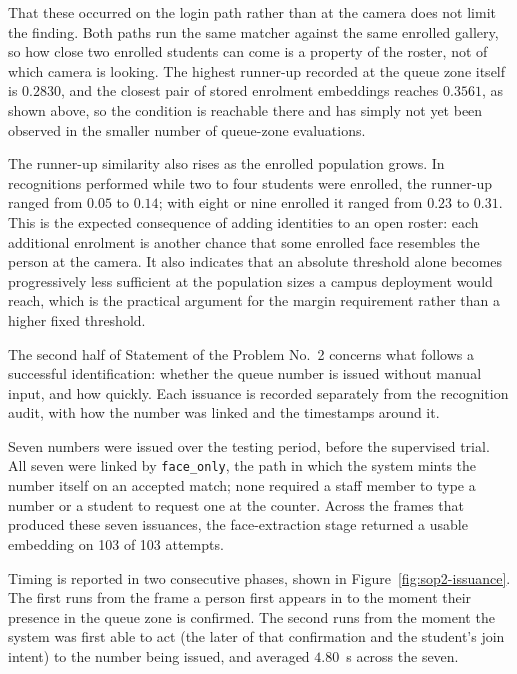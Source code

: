 \documentclass{research}
\begin{document}
That these occurred on the login path rather than at the camera does not
limit the finding. Both paths run the same matcher against the same
enrolled gallery, so how close two enrolled students can come is a
property of the roster, not of which camera is looking. The highest
runner-up recorded at the queue zone itself is $0.2830$, and the closest
pair of stored enrolment embeddings reaches $0.3561$,
as shown above, so the condition is reachable
there and has simply not yet been observed in the smaller number of
queue-zone evaluations.

The runner-up similarity also rises as the enrolled population grows. In
recognitions performed while two to four students were enrolled, the
runner-up ranged from $0.05$ to $0.14$; with eight or nine enrolled it
ranged from $0.23$ to $0.31$. This is the expected consequence of adding
identities to an open roster: each additional enrolment is another chance
that some enrolled face resembles the person at the camera. It also
indicates that an absolute threshold alone becomes progressively less
sufficient at the population sizes a campus deployment would reach, which
is the practical argument for the margin requirement rather than a higher
fixed threshold.

\label{subsec:sop2-issuance}

The second half of Statement of the Problem No.~2 concerns what follows a
successful identification: whether the queue number is issued without
manual input, and how quickly. Each issuance is recorded separately from
the recognition audit, with how the number was linked and the timestamps
around it.

Seven numbers were issued over the testing period, before the
supervised trial. All seven were linked
by \texttt{face\_only}, the path in which the system mints the number
itself on an accepted match; none required a staff member to type a
number or a student to request one at the counter. Across the frames that
produced these seven issuances, the face-extraction stage returned a
usable embedding on 103 of 103 attempts.

Timing is reported in two consecutive phases, shown in
Figure~\ref{fig:sop2-issuance}. The first runs from the frame a person
first appears in to the moment their presence in the queue zone is
confirmed. The second runs from the moment the system was first able to
act (the later of that confirmation and the student's join intent)
to the number being issued, and averaged $4.80$~s across the seven.
\end{document}
